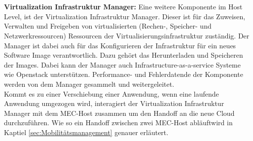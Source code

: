 \documentclass[runningheads]{llncs}
\numberwithin{figure}{section}
\begin{document}
\\
\\ 
\textbf{Virtualization Infrastruktur Manager:} Eine weitere Komponente im Host Level, ist der Virtualization Infrastruktur
Manager. Dieser ist für das Zuweisen, Verwalten und Freigeben von virtualisierten (Rechen-, Speicher- und Netzwerkressourcen)
Ressourcen der Virtualisierungsinfrastruktur zuständig. Der Manager ist dabei auch für das Konfigurieren der Infrastruktur für 
ein neues Software Image verantwortlich. Dazu gehört das Herunterladen und Speicheren der Images. Dabei kann der Manager auch 
Infrastructure-as-a-service Systeme wie Openstack unterstützen. Performance- und Fehlerdatende der Komponente werden von dem Manager gesammelt und weitergeleitet.
\\
Kommt es zu einer Verschiebung einer Anwendung, wenn eine laufende Anwendung umgezogen wird,
interagiert der Virtualization Infrastruktur Manager mit dem MEC-Host zusammen um den Handoff an die neue Cloud durchzuführen.
Wie so ein Handoff zwischen zwei MEC-Host abläuftwird in Kaptiel \ref{sec:Mobilitätsmanagement} genauer erläutert.
\end{document}
